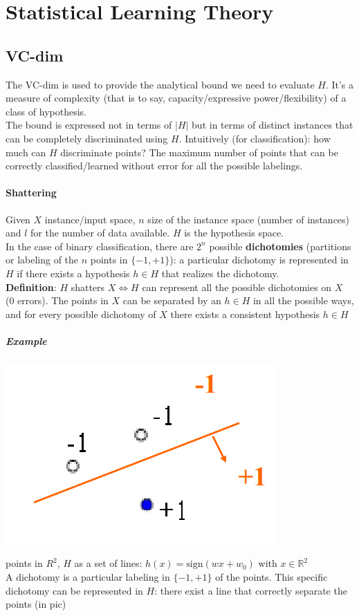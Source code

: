 \documentclass[10pt]{report}
\begin{document}
\section{Statistical Learning Theory}
\subsection{VC-dim} The VC-dim is used to provide the analytical bound we need to evaluate $H$. It's a measure of complexity (that is to say, capacity/expressive power/flexibility) of a class of hypothesis.\\
The bound is expressed not in terms of $|H|$ but in terms of distinct instances that can be completely discriminated using $H$. Intuitively (for classification): how much can $H$ discriminate points? The maximum number of points that can be correctly classified/learned without error for all the possible labelings.
\paragraph{Shattering} Given $X$ instance/input space, $n$ size of the instance space (number of instances) and $l$ for the number of data available. $H$ is the hypothesis space.\\
In the case of binary classification, there are $2^n$ possible \textbf{dichotomies} (partitions or labeling of the $n$ points in $\{-1,+1\}$): a particular dichotomy is represented in $H$ if there exists a hypothesis $h\in H$ that realizes the dichotomy.\\
\textbf{Definition}: $H$ shatters $X \Leftrightarrow H$ can represent all the possible dichotomies on $X$ (0 errors). The points in $X$ can be separated by an $h\in H$ in all the possible ways, and for every possible dichotomy of $X$ there exists a consistent hypothesis $h\in H$
\subparagraph{Example} \begin{multicols}{2}
\begin{center}
	\includegraphics[scale=0.5]{14.png}
\end{center}
 points in $R^2$, $H$ as a set of lines: $h(x) = \text{sign}(wx + w_0)$ with $x\in \mathbb{R}^2$\\
A dichotomy is a particular labeling in $\{-1,+1\}$ of the points. This specific dichotomy can be represented in $H$: there exist a line that correctly separate the points (in pic)
\end{multicols}
\end{document}

